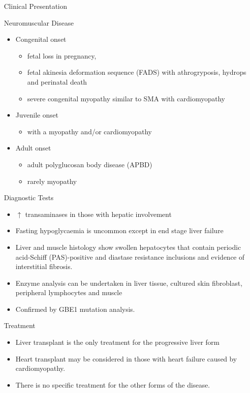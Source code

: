 \documentclass[presentation, smaller]{beamer}
\begin{document}
\begin{frame}[label={sec:org0a32995}]{Clinical Presentation}
\begin{block}{Neuromuscular Disease}
\begin{itemize}
\item Congenital onset
\begin{itemize}
\item fetal loss in pregnancy,
\item fetal akinesia deformation sequence (FADS) with athrogryposis, hydrops and perinatal death
\item severe congenital myopathy similar to SMA with \textpm{} cardiomyopathy
\end{itemize}
\item Juvenile onset
\begin{itemize}
\item with a myopathy and/or cardiomyopathy
\end{itemize}
\item Adult onset
\begin{itemize}
\item adult polyglucosan body disease (APBD)
\item rarely myopathy
\end{itemize}
\end{itemize}
\end{block}
\end{frame}

\begin{frame}[label={sec:org5449319}]{Diagnostic Tests}
\begin{itemize}
\item \(\uparrow\) transaminases in those with hepatic involvement
\item Fasting hypoglycaemia is uncommon except in end stage liver failure
\item Liver and muscle histology show swollen hepatocytes that contain
periodic acid-Schiff (PAS)-positive and diastase resistance
inclusions and evidence of interstitial fibrosis.
\item Enzyme analysis can be undertaken in liver tissue, cultured skin
fibroblast, peripheral lymphocytes and muscle
\item Confirmed by GBE1 mutation analysis.
\end{itemize}
\end{frame}

\begin{frame}[label={sec:org7d36a4d}]{Treatment}
\begin{itemize}
\item Liver transplant is the only treatment for the progressive liver form
\item Heart transplant may be considered in those with heart failure caused by cardiomyopathy.
\item There is no specific treatment for the other forms of the disease.
\end{itemize}
\end{frame}
\end{document}
